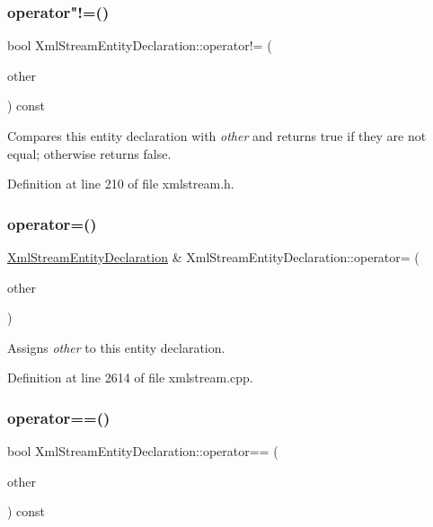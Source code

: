 \subsubsection{\texorpdfstring{operator"!=()}{operator!=()}}
{\footnotesize\ttfamily bool Xml\+Stream\+Entity\+Declaration\+::operator!= (\begin{DoxyParamCaption}\item[{const \hyperlink{class_xml_stream_entity_declaration}{Xml\+Stream\+Entity\+Declaration} \&}]{other }\end{DoxyParamCaption}) const\hspace{0.3cm}{\ttfamily [inline]}}

Compares this entity declaration with {\itshape other} and returns {\ttfamily true} if they are not equal; otherwise returns {\ttfamily false}. 

Definition at line 210 of file xmlstream.\+h.

\mbox{\label{class_xml_stream_entity_declaration_a597aca72eac0086d5184ffd8b18eb588}} 
\subsubsection{\texorpdfstring{operator=()}{operator=()}}
{\footnotesize\ttfamily \hyperlink{class_xml_stream_entity_declaration}{Xml\+Stream\+Entity\+Declaration} \& Xml\+Stream\+Entity\+Declaration\+::operator= (\begin{DoxyParamCaption}\item[{const \hyperlink{class_xml_stream_entity_declaration}{Xml\+Stream\+Entity\+Declaration} \&}]{other }\end{DoxyParamCaption})}

Assigns {\itshape other} to this entity declaration. 

Definition at line 2614 of file xmlstream.\+cpp.

\mbox{\label{class_xml_stream_entity_declaration_a82332fb4374694445d31b54279f9d588}} 
\subsubsection{\texorpdfstring{operator==()}{operator==()}}
{\footnotesize\ttfamily bool Xml\+Stream\+Entity\+Declaration\+::operator== (\begin{DoxyParamCaption}\item[{const \hyperlink{class_xml_stream_entity_declaration}{Xml\+Stream\+Entity\+Declaration} \&}]{other }\end{DoxyParamCaption}) const\hspace{0.3cm}{\ttfamily [inline]}}

